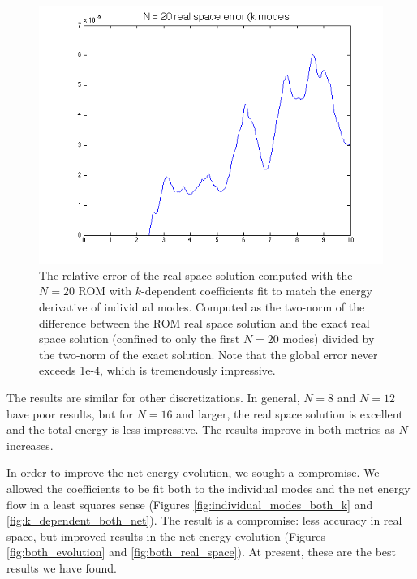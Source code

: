 \documentclass{article}
\begin{document}
\begin{figure}[h]
\includegraphics[width=\textwidth]{real_space_20.png}
\caption{The relative error of the real space solution computed with the $N=20$ ROM with $k$-dependent coefficients fit to match the energy derivative of individual modes. Computed as the two-norm of the difference between the ROM real space solution and the exact real space solution (confined to only the first $N=20$ modes) divided by the two-norm of the exact solution. Note that the global error never exceeds 1e-4, which is tremendously impressive.}\label{fig:real_space_k}
\end{figure}

The results are similar for other discretizations. In general, $N=8$ and $N=12$ have poor results, but for $N=16$ and larger, the real space solution is excellent and the total energy is less impressive. The results improve in both metrics as $N$ increases.

In order to improve the net energy evolution, we sought a compromise. We allowed the coefficients to be fit both to the individual modes and the net energy flow in a least squares sense (Figures \ref{fig:individual_modes_both_k} and \ref{fig:k_dependent_both_net}). The result is a compromise: less accuracy in real space, but improved results in the net energy evolution (Figures \ref{fig:both_evolution} and \ref{fig:both_real_space}). At present, these are the best results we have found.
\end{document}
